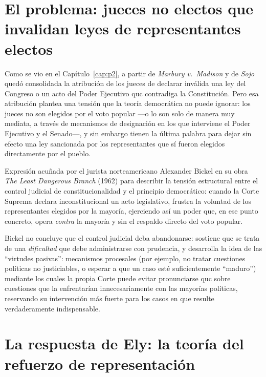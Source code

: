 \documentclass[12pt,oneside]{book}
\begin{document}
\section{El problema: jueces no electos que invalidan leyes de representantes electos}

Como se vio en el Capítulo~\ref{cap:p2}, a partir de \textit{Marbury v.\ Madison} y
de \textit{Sojo} quedó consolidada la atribución de los jueces de declarar
inválida una ley del Congreso o un acto del Poder Ejecutivo quc contradiga la
Constitución. Pero esa atribución plantea una tensión que la teoría democrática no
puede ignorar: los jueces no son elegidos por el voto popular —o lo son solo de
manera muy mediata, a través de mecanismos de designación en los que interviene el
Poder Ejecutivo y el Senado—, y sin embargo tienen la última palabra para dejar sin
efecto una ley sancionada por los representantes que sí fueron elegidos
directamente por el pueblo.

\begin{defbox}
Expresión acuñada por el jurista norteamericano Alexander Bickel en su obra
\textit{The Least Dangerous Branch} (1962) para describir la tensión estructural
entre el control judicial de constitucionalidad y el principio democrático: cuando
la Corte Suprema declara inconstitucional un acto legislativo, frustra la voluntad
de los representantes elegidos por la mayoría, ejerciendo así un poder que, en ese
punto concreto, opera \textit{contra} la mayoría y sin el respaldo directo del voto
popular.
\end{defbox}

Bickel no concluye que el control judicial deba abandonarse: sostiene que se trata
de una \textit{dificultad} que debe administrarse con prudencia, y desarrolla la
idea de las ``virtudes pasivas'': mecanismos procesales (por ejemplo, no tratar
cuestiones políticas no justiciables, o esperar a que un caso esté suficientemente
``maduro'') mediante los cuales la propia Corte puede evitar pronunciarse quc
sobre cuestiones que la enfrentarían innecesariamente con las mayorías políticas,
reservando su intervención más fuerte para los casos en que resulte
verdaderamente indispensable.

\section{La respuesta de Ely: la teoría del refuerzo de representación}
\end{document}
